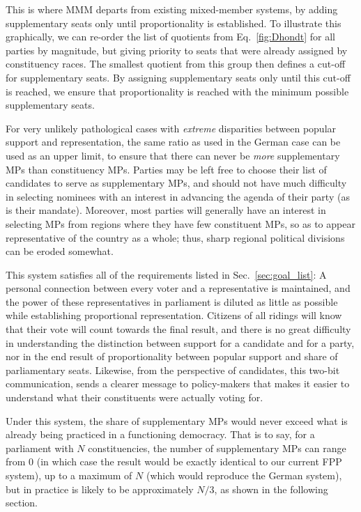 \documentclass[DIV=calc, paper=a4, fontsize=11pt, twocolumn]{scrartcl}	 %
\begin{document}
This is where MMM departs from existing mixed-member systems, by adding supplementary seats only until proportionality is established. To illustrate this graphically, we can re-order the list of quotients from Eq.~\ref{fig:Dhondt} for all parties by magnitude, but giving priority to seats that were already assigned by constituency races. The smallest quotient from this group then defines a cut-off for supplementary seats. By assigning supplementary seats only until this cut-off is reached, we ensure that proportionality is reached with the minimum possible supplementary seats. 

For very unlikely pathological cases with \emph{extreme} disparities between popular support and representation, the same ratio as used in the German case can be used as an upper limit, to ensure that there can never be \emph{more} supplementary MPs than constituency MPs. 
Parties may be left free to choose their list of candidates to serve as supplementary MPs, and should not have much difficulty in selecting nominees with an interest in advancing the agenda of their party (as is their mandate). Moreover, most parties will generally have an interest in selecting MPs from regions where they have few constituent MPs, so as to appear representative of the country as a whole; thus, sharp regional political divisions can be eroded somewhat.

This system satisfies all of the requirements listed in Sec.~\ref{sec:goal_list}: A personal connection between every voter and a representative is maintained, and the power of these representatives in parliament is diluted as little as possible while establishing proportional representation. 
Citizens of all ridings will know that their vote will count towards the final result, and there is no great difficulty in understanding the  distinction between support for a candidate and for a party, nor in the end result of proportionality between popular support and share of parliamentary seats.
Likewise, from the perspective of candidates, this two-bit communication, sends a clearer message to policy-makers that makes it easier to understand what their constituents were actually voting for.

Under this system, the share of supplementary MPs would never exceed what is already being practiced in a functioning democracy. That is to say, for a parliament with $N$ constituencies, the number of supplementary MPs can range from 0 (in which case the result would be exactly identical to our current FPP system), up to a maximum of $N$ (which would reproduce the German system), but in practice is likely to be approximately $N/3$, as shown in the following section.
\end{document}
